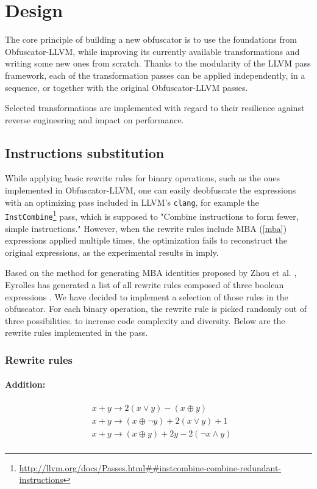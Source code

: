 \documentclass[
  digital, %
  notable,   %
  twoside, %
  nolof,     %
  nolot,     %
]{fithesis3}
\theoremstyle{definition}
\begin{document}
\chapter{Design}

The core principle of building a new obfuscator is to use the foundations from Obfuscator-LLVM, while improving its currently available transformations and writing some new ones from scratch. Thanks to the modularity of the LLVM pass framework, each of the transformation passes can be applied independently, in a sequence, or together with the original Obfuscator-LLVM passes. 

Selected transformations are implemented with regard to their resilience against reverse engineering and impact on performance.

\section{Instructions substitution}
While applying basic rewrite rules for binary operations, such as the ones implemented in Obfuscator-LLVM, one can easily deobfuscate the expressions with an optimizing pass included in LLVM's \texttt{clang}, for example the \texttt{InstCombine}\footnote{\url{http://llvm.org/docs/Passes.html##instcombine-combine-redundant-instructions}} pass, which is supposed to "Combine instructions to form fewer, simple instructions." However, when the rewrite rules include MBA (\ref{mba}) expressions applied multiple times, the optimization fails to reconstruct the original expressions, as the experimental results in \cite{eyrollesMBAobf} imply. 

Based on the method for generating MBA identities proposed by Zhou et al. \cite{mba_zhou}, Eyrolles has generated a list of all rewrite rules composed of three boolean expressions \cite{eyrollesMBAobf}. We have decided to implement a selection of those rules in the obfuscator. For each binary operation, the rewrite rule is picked randomly out of three possibilities. to increase code complexity and diversity. Below are the rewrite rules implemented in the pass.

\subsection{Rewrite rules}
\subsubsection{Addition:}
$$
\begin{aligned}
&x+y \rightarrow 2(x \vee y) - (x \oplus y) \\
&x+y \rightarrow(x \oplus \neg y)+ 2( x \vee y) + 1 \\
&x+y \rightarrow(x \oplus y)+2 y-2 (\neg x \wedge y) \\
\end{aligned}
$$
\end{document}
